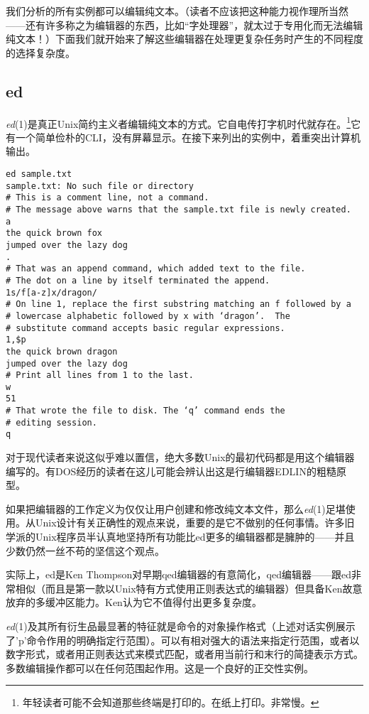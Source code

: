 \documentclass[12pt,oneside]{book}
\begin{document}
\begin{common-format}
我们分析的所有实例都可以编辑纯文本。（读者不应该把这种能力视作理所当然——还有许多称之为编辑器的东西，比如“字处理器”，就太过于专用化而无法编辑纯文本！）下面我们就开始来了解这些编辑器在处理更复杂任务时产生的不同程度的选择复杂度。


\subsection{ed}
\textit{ed}(1)是真正Unix简约主义者编辑纯文本的方式。它自电传打字机时代就存在。\footnote{年轻读者可能不会知道那些终端是打印的。在纸上打印。非常慢。}它有一个简单俭朴的CLI，没有屏幕显示。在接下来列出的实例中，着重突出计算机输出。

\begin{Verbatim}
ed sample.txt
sample.txt: No such file or directory
# This is a comment line, not a command.
# The message above warns that the sample.txt file is newly created.
a
the quick brown fox
jumped over the lazy dog
.
# That was an append command, which added text to the file.  
# The dot on a line by itself terminated the append.
1s/f[a-z]x/dragon/
# On line 1, replace the first substring matching an f followed by a
# lowercase alphabetic followed by x with ‘dragon’.  The
# substitute command accepts basic regular expressions.
1,$p
the quick brown dragon
jumped over the lazy dog
# Print all lines from 1 to the last.
w
51
# That wrote the file to disk. The ‘q’ command ends the
# editing session.
q
\end{Verbatim}

对于现代读者来说这似乎难以置信，绝大多数Unix的最初代码都是用这个编辑器编写的。有DOS经历的读者在这儿可能会辨认出这是行编辑器EDLIN的粗糙原型。

如果把编辑器的工作定义为仅仅让用户创建和修改纯文本文件，那么\textit{ed}(1)足堪使用。从Unix设计有关正确性的观点来说，重要的是它不做别的任何事情。许多旧学派的Unix程序员半认真地坚持所有功能比ed更多的编辑器都是臃肿的——并且少数仍然一丝不苟的坚信这个观点。

实际上，ed是Ken Thompson对早期qed\cite{RitchieQED}编辑器的有意简化，qed编辑器——跟ed非常相似（而且是第一款以Unix特有方式使用正则表达式的编辑器）但具备Ken故意放弃的多缓冲区能力。Ken认为它不值得付出更多复杂度。

\textit{ed}(1)及其所有衍生品最显著的特征就是命令的对象操作格式（上述对话实例展示了'p'命令作用的明确指定行范围）。可以有相对强大的语法来指定行范围，或者以数字形式，或者用正则表达式来模式匹配，或者用当前行和末行的简捷表示方式。多数编辑操作都可以在任何范围起作用。这是一个良好的正交性实例。


\end{common-format}
\end{document}
